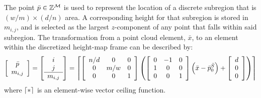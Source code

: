 			The point $\bar{p}\in{\Bbb Z}^{{\cal M}}$ is used to represent the location of a discrete subregion that is $(w/m) \times (d/n)$ area. A corresponding height for that subregion is stored in $m_{i,j}$, and is selected as the largest $z$-component of any point that falls within said subregion. The transformation from a point cloud element, $\bar{x}$, to an element within the discretized height-map frame can be described by:
				\begin{equation}
					\left[
						\begin{array}{c}
						\bar{p} \\
						m_{i,j}  	\\
						\end{array}
					\right]
					=
					\left[
						\begin{array}{c}
						i \\
						j \\ \hline
						m_{i,j}  	\\
						\end{array}
					\right]
					=
					\left\lceil
						\left[
							\begin{array}{ccc}
							n/d & 0 	& 0 \\
							0 	& m/w 	& 0 \\
							0 	& 0 	& 1 \\
							\end{array}
						\right]
						\left(
							\left[
								\begin{array}{ccc}
								0 &-1 & 0 \\
								1 & 0 & 0 \\
								0 & 0 & 1 \\
								\end{array}
							\right]
							\left(\bar{x}-\bar{p}_{0}^{\bar{S}}\right)
							+
							\left[
								\begin{array}{c}
								d \\
								0 \\
								0 \\
								\end{array}
							\right]
						\right)
					\right\rceil
					\label{eq::toheightmapframe}
				\end{equation}
			where $\left\lceil*\right\rceil$ is an element-wise vector ceiling function.

